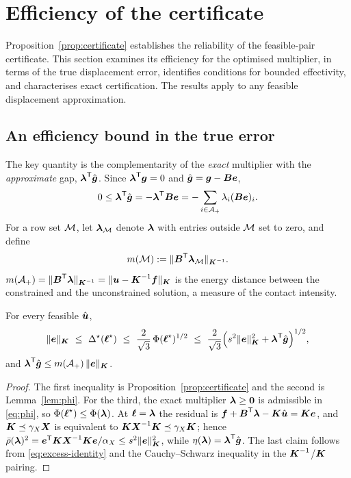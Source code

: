 
\section{Efficiency of the certificate}\label{sec:analysis}

Proposition~\ref{prop:certificate} establishes the reliability of the feasible-pair certificate. This section examines its efficiency for the optimised
multiplier, in terms of the true displacement error, identifies conditions for bounded effectivity, and characterises exact certification. The results
apply to any feasible displacement approximation.

\subsection{An efficiency bound in the true error}

The key quantity is the complementarity of the \emph{exact} multiplier with the \emph{approximate} gap,
$\vlam\T\gh$. Since $\vlam\T\vg=0$ and $\gh=\vg-\mB\ve$,
\begin{equation}\label{eq:excess-identity}
  0\le\vlam\T\gh=-\vlam\T\mB\ve=-\sum_{i\in\Aplus}\lambda_i(\mB\ve)_i .
\end{equation}
For a row set $\Miss$, let $\vlam_{\Miss}$ denote $\vlam$ with entries outside $\Miss$ set to zero, and define
\begin{equation}\label{eq:intensity}
  m(\Miss):=\normKi{\mB\T\vlam_{\Miss}} .
\end{equation}
$m(\Aplus)=\normKi{\mB\T\vlam}=\normK{\vu-\mK^{-1}\vf}$ is the energy distance between the constrained and the unconstrained
solution, a measure of the contact intensity.

\begin{theorem}[efficiency]\label{thm:efficiency}
For every feasible $\uh$,
\begin{equation}\label{eq:efficiency}
  \normK{\ve}\ \le\ \Dstar(\lmr)\ \le\ \frac{2}{\sqrt3}\,\Phi(\lmr)^{1/2}\ \le\ \frac{2}{\sqrt3}\Big(s^2\normK{\ve}^2+\vlam\T\gh\Big)^{1/2},
\end{equation}
and $\vlam\T\gh\le m(\Aplus)\,\normK{\ve}$.
\end{theorem}
\begin{proof}
The first inequality is Proposition~\ref{prop:certificate} and the second is Lemma~\ref{lem:phi}. For the third, the exact multiplier
$\vlam\ge\boldsymbol 0$ is admissible in \eqref{eq:phi}, so $\Phi(\lmr)\le\Phi(\vlam)$. At $\vell=\vlam$ the residual is
$\vf+\mB\T\vlam-\mK\uh=\mK\ve$, and $\mK\preceq\gamma_X\mX$ is equivalent to $\mK\mX^{-1}\mK\preceq\gamma_X\mK$; hence
$\rhob(\vlam)^2=\ve\T\mK\mX^{-1}\mK\ve/\alpha_X\le s^2\normK{\ve}^2$, while $\eta(\vlam)=\vlam\T\gh$. The last claim follows from
\eqref{eq:excess-identity} and the Cauchy--Schwarz inequality in the $\mK^{-1}$/$\mK$ pairing.
\end{proof}

